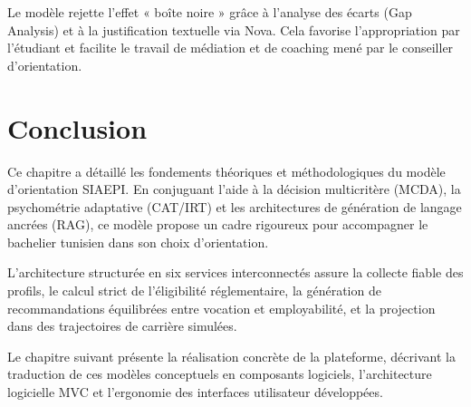 Le modèle rejette l'effet « boîte noire » grâce à l'analyse des écarts (Gap Analysis) et à la justification textuelle via Nova. Cela favorise l'appropriation par l'étudiant et facilite le travail de médiation et de coaching mené par le conseiller d'orientation.

\section*{Conclusion}

Ce chapitre a détaillé les fondements théoriques et méthodologiques du modèle d'orientation SIAEPI. En conjuguant l'aide à la décision multicritère (MCDA), la psychométrie adaptative (CAT/IRT) et les architectures de génération de langage ancrées (RAG), ce modèle propose un cadre rigoureux pour accompagner le bachelier tunisien dans son choix d'orientation.

L'architecture structurée en six services interconnectés assure la collecte fiable des profils, le calcul strict de l'éligibilité réglementaire, la génération de recommandations équilibrées entre vocation et employabilité, et la projection dans des trajectoires de carrière simulées.

Le chapitre suivant présente la réalisation concrète de la plateforme, décrivant la traduction de ces modèles conceptuels en composants logiciels, l'architecture logicielle MVC et l'ergonomie des interfaces utilisateur développées.
